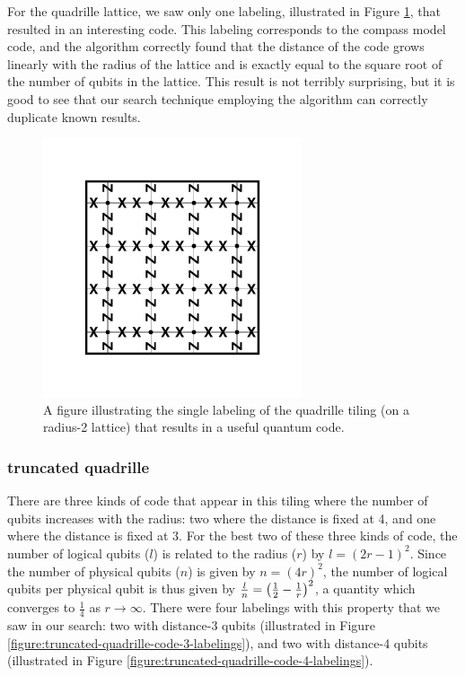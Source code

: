 \documentclass[twocolumn,showpacs,preprintnumbers,amsmath,amssymb,nofootinbib,pra,floatfix]{revtex4-1}
\begin{document}
For the quadrille lattice, we saw only one labeling, illustrated in Figure \ref{figure:quadrille-code-labeling}, that resulted in an interesting code.  This labeling corresponds to the compass model code, and the algorithm correctly found that the distance of the code grows linearly with the radius of the lattice and is exactly equal to the square root of the number of qubits in the lattice.  This result is not terribly surprising, but it is good to see that our search technique employing the algorithm can correctly duplicate known results.

\begin{figure}
\includegraphics[width=3in]{quadrille-code-labeling}
\caption{
\label{figure:quadrille-code-labeling}
A figure illustrating the single labeling of the quadrille tiling (on a radius-2 lattice) that results in a useful quantum code.
}
\end{figure}
\subsubsection{truncated quadrille}

There are three kinds of code that appear in this tiling where the number of qubits increases with the radius:  two where the distance is fixed at 4, and one where the distance is fixed at 3.  For the best two of these three kinds of code, the number of logical qubits ($l$) is related to the radius ($r$) by $l=(2r-1)^2$.    Since the number of physical qubits ($n$) is given by $n=(4r)^2$, the number of logical qubits per physical qubit is thus given by $\frac{l}{n}=\left(\frac{1}{2}-\frac{1}{r}\right)^2$, a quantity which converges to $\frac{1}{4}$ as $r\to\infty$.  There were four labelings with this property that we saw in our search:  two with distance-3 qubits (illustrated in Figure \ref{figure:truncated-quadrille-code-3-labelings}), and two with distance-4 qubits (illustrated in Figure \ref{figure:truncated-quadrille-code-4-labelings}).
\end{document}
